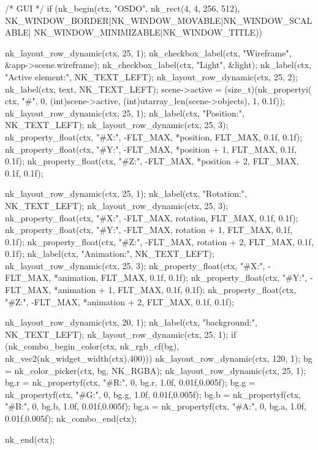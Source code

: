 \begin{multicols}{2}
\begin{ccode}
{{        /* GUI */
        if (nk_begin(ctx, "OSDO", nk_rect(4, 4, 256, 512),
            NK_WINDOW_BORDER|NK_WINDOW_MOVABLE|NK_WINDOW_SCALABLE|
            NK_WINDOW_MINIMIZABLE|NK_WINDOW_TITLE)) {
            nk_layout_row_dynamic(ctx, 25, 1);
            nk_checkbox_label(ctx, "Wireframe",
                              &app->scene.wireframe);
            nk_checkbox_label(ctx, "Light",
                              &light);
            nk_label(ctx, "Active element:", NK_TEXT_LEFT);
            nk_layout_row_dynamic(ctx, 25, 2);
            nk_label(ctx, text, NK_TEXT_LEFT);
            scene->active = (size_t)(nk_propertyi(
                                ctx, "#", 0, (int)scene->active,
                                (int)utarray_len(scene->objects), 1, 0.1f));
            nk_layout_row_dynamic(ctx, 25, 1);
            nk_label(ctx, "Position:", NK_TEXT_LEFT);
            nk_layout_row_dynamic(ctx, 25, 3);
            nk_property_float(ctx, "#X:", -FLT_MAX, *position,
                              FLT_MAX, 0.1f, 0.1f);
            nk_property_float(ctx, "#Y:", -FLT_MAX, *position + 1,
                              FLT_MAX, 0.1f, 0.1f);
            nk_property_float(ctx, "#Z:", -FLT_MAX, *position + 2,
                              FLT_MAX, 0.1f, 0.1f);

            nk_layout_row_dynamic(ctx, 25, 1);
            nk_label(ctx, "Rotation:", NK_TEXT_LEFT);
            nk_layout_row_dynamic(ctx, 25, 3);
            nk_property_float(ctx, "#X:", -FLT_MAX, rotation,
                              FLT_MAX, 0.1f, 0.1f);
            nk_property_float(ctx, "#Y:", -FLT_MAX, rotation + 1,
                              FLT_MAX, 0.1f, 0.1f);
            nk_property_float(ctx, "#Z:", -FLT_MAX, rotation + 2,
                              FLT_MAX, 0.1f, 0.1f);
            nk_label(ctx, "Animation:", NK_TEXT_LEFT);
            nk_layout_row_dynamic(ctx, 25, 3);
            nk_property_float(ctx, "#X:", -FLT_MAX, *animation,
                              FLT_MAX, 0.1f, 0.1f);
            nk_property_float(ctx, "#Y:", -FLT_MAX, *animation + 1,
                              FLT_MAX, 0.1f, 0.1f);
            nk_property_float(ctx, "#Z:", -FLT_MAX, *animation + 2,
                              FLT_MAX, 0.1f, 0.1f);

            nk_layout_row_dynamic(ctx, 20, 1);
            nk_label(ctx, "background:", NK_TEXT_LEFT);
            nk_layout_row_dynamic(ctx, 25, 1);
            if (nk_combo_begin_color(ctx, nk_rgb_cf(bg), nk_vec2(nk_widget_width(ctx),400))) {
                nk_layout_row_dynamic(ctx, 120, 1);
                bg = nk_color_picker(ctx, bg, NK_RGBA);
                nk_layout_row_dynamic(ctx, 25, 1);
                bg.r = nk_propertyf(ctx, "#R:", 0, bg.r, 1.0f, 0.01f,0.005f);
                bg.g = nk_propertyf(ctx, "#G:", 0, bg.g, 1.0f, 0.01f,0.005f);
                bg.b = nk_propertyf(ctx, "#B:", 0, bg.b, 1.0f, 0.01f,0.005f);
                bg.a = nk_propertyf(ctx, "#A:", 0, bg.a, 1.0f, 0.01f,0.005f);
                nk_combo_end(ctx);
            }
        }
        nk_end(ctx);

}}
\end{ccode}
\end{multicols}
